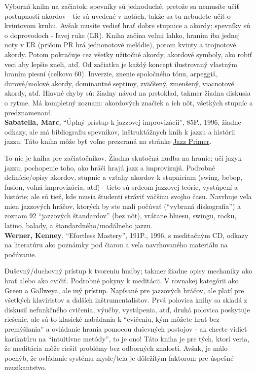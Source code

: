 Výborná kniha na začiatok; spevníky sú jednoduché, pretože sa nemusíte učiť postupnosti akordov - tie sú uvedené v notách, takže sa tu nebudete učiť o kvintovom kruhu. Avšak musíte vedieť hrať dobre stupnice a akordy; spevníky sú o doprovodoch - ľavej ruke (ĽR). Kniha začína veľmi ľahko, hraním iba jednej noty v ĽR (pričom PR hrá jednonotové melódie), potom kvinty a trojnotové akordy. Potom pokračuje cez všetky užitočné akordy, akordové symboly, ako robiť veci aby lepšie zneli, atď. Od začiatku je každý koncept ilustrovaný vlastným hraním piesní (celkovo 60). Inverzie, znenie spoločného tónu, arpeggiá, durové/molové akordy, dominantné septimy, zväčšený, zmenšený, viacnotové akordy, atď. Hlavné chyby sú: žiadny návod na prstoklad, takmer žiadna diskusia o rytme. Má kompletný zoznam: akordových značiek a ich nôt, všetkých stupníc a predznamenaní.
\medskip\\
\textbf{Sabatella, Marc}, “Úplný prístup k jazzovej improvizácii”, 85P., 1996, žiadne odkazy, ale má bibliografiu spevníkov, inštruktážnych kníh k jazzu a histórii jazzu. Táto kniha môže byť voľne prezeraná na stránke \href{http://www.outsideshore.com/music/a-jazz-improvisation-primer/}{Jazz Primer}.

To nie je kniha pre začiatočníkov. Žiadna skutočná hudba na hranie; učí jazyk jazzu, pochopenie toho, ako hráči hrajú jazz a improvizujú. Podrobné definície/opisy akordov, stupníc a vzťahy akordov k stupniciam (swing, bebop, fusion, voľná improvizácia, atď) - tieto sú srdcom jazzovej teórie, vystúpení a histórie; ale sú tiež, kde musia študenti stráviť väčšinu svojho času. Navrhuje veľa mien jazzových hráčov, ktorých by ste mali počúvať (“vybraná diskografia”) a zoznam 92 “jazzových štandardov” (bez nôt), vrátane bluesu, swingu, rocku, latino, balady, a štandardného/modálneho jazzu.
\medskip\\
\textbf{Werner, Kenney}, “Efortless Mastery”, 191P., 1996, s meditačným CD, odkazy na literatúru ako poznámky pod čiarou a veľa navrhovaného materiálu na počúvanie. 

Duševný/duchovný prístup k tvoreniu hudby; takmer žiadne opisy mechaniky ako hrať alebo ako cvičiť. Podrobné pokyny k meditácii. V rovnakej kategórii ako Green a Gallweya, ale iný prístup. Napísané pre jazzových hráčov, ale platí pre všetkých klaviristov a ďalších inštrumentalistov. Prvá polovica knihy sa skladá z diskusií nefunkčného cvičenia, výučby, vystúpenia, atď, druhá polovica poskytuje riešenie, ale sú to klasické nabádania k “cvičeniu, kým môžete hrať bez premýšľania” a ovládanie hrania pomocou duševných postojov - ak chcete vidieť karikatúru na “intuitívne metódy”, to je ono! Táto kniha je pre tých, ktorí veria, že meditácia môže riešiť problémy bez odborných znalostí. Avšak, je málo pochýb, že ovládanie systému mysle/tela je dôležitým faktorom pre úspešné muzikantstvo.

